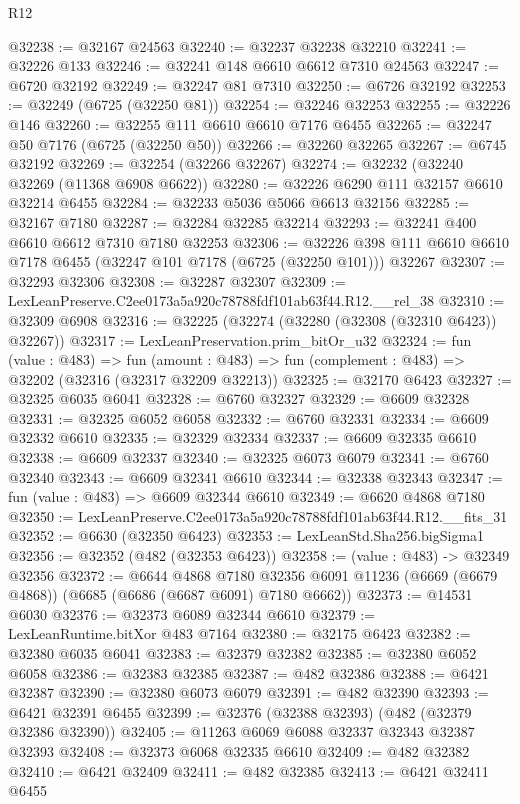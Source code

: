 \begin{lexlean}{R12}
\begin{coremodule}
@32238 := @32167 @24563
@32240 := @32237 @32238 @32210
@32241 := @32226 @133
@32246 := @32241 @148 @6610 @6612 @7310 @24563
@32247 := @6720 @32192
@32249 := @32247 @81 @7310
@32250 := @6726 @32192
@32253 := @32249 (@6725 (@32250 @81))
@32254 := @32246 @32253
@32255 := @32226 @146
@32260 := @32255 @111 @6610 @6610 @7176 @6455
@32265 := @32247 @50 @7176 (@6725 (@32250 @50))
@32266 := @32260 @32265
@32267 := @6745 @32192
@32269 := @32254 (@32266 @32267)
@32274 := @32232 (@32240 @32269 (@11368 @6908 @6622))
@32280 := @32226 @6290 @111 @32157 @6610 @32214 @6455
@32284 := @32233 @5036 @5066 @6613 @32156
@32285 := @32167 @7180
@32287 := @32284 @32285 @32214
@32293 := @32241 @400 @6610 @6612 @7310 @7180 @32253
@32306 := @32226 @398 @111 @6610 @6610 @7178 @6455 (@32247 @101 @7178 (@6725 (@32250 @101))) @32267
@32307 := @32293 @32306
@32308 := @32287 @32307
@32309 := LexLeanPreserve.C2ee0173a5a920c78788fdf101ab63f44.R12.__rel_38
@32310 := @32309 @6908
@32316 := @32225 (@32274 (@32280 (@32308 (@32310 @6423)) @32267))
@32317 := LexLeanPreservation.prim_bitOr_u32
@32324 := fun (value : @483) =>
  fun (amount : @483) => fun (complement : @483) => @32202 (@32316 (@32317 @32209 @32213))
@32325 := @32170 @6423
@32327 := @32325 @6035 @6041
@32328 := @6760 @32327
@32329 := @6609 @32328
@32331 := @32325 @6052 @6058
@32332 := @6760 @32331
@32334 := @6609 @32332 @6610
@32335 := @32329 @32334
@32337 := @6609 @32335 @6610
@32338 := @6609 @32337
@32340 := @32325 @6073 @6079
@32341 := @6760 @32340
@32343 := @6609 @32341 @6610
@32344 := @32338 @32343
@32347 := fun (value : @483) => @6609 @32344 @6610
@32349 := @6620 @4868 @7180
@32350 := LexLeanPreserve.C2ee0173a5a920c78788fdf101ab63f44.R12.__fits_31
@32352 := @6630 (@32350 @6423)
@32353 := LexLeanStd.Sha256.bigSigma1
@32356 := @32352 (@482 (@32353 @6423))
@32358 := (value : @483) -> @32349 @32356
@32372 := @6644
    @4868
    @7180
    @32356
    @6091
    @11236
    (@6669 (@6679 @4868))
    (@6685 (@6686 (@6687 @6091) @7180 @6662))
@32373 := @14531 @6030
@32376 := @32373 @6089 @32344 @6610
@32379 := LexLeanRuntime.bitXor @483 @7164
@32380 := @32175 @6423
@32382 := @32380 @6035 @6041
@32383 := @32379 @32382
@32385 := @32380 @6052 @6058
@32386 := @32383 @32385
@32387 := @482 @32386
@32388 := @6421 @32387
@32390 := @32380 @6073 @6079
@32391 := @482 @32390
@32393 := @6421 @32391 @6455
@32399 := @32376 (@32388 @32393) (@482 (@32379 @32386 @32390))
@32405 := @11263 @6069 @6088 @32337 @32343 @32387 @32393
@32408 := @32373 @6068 @32335 @6610
@32409 := @482 @32382
@32410 := @6421 @32409
@32411 := @482 @32385
@32413 := @6421 @32411 @6455

\end{coremodule}
\end{lexlean}
